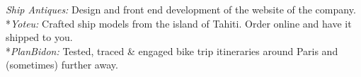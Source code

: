 \documentclass[11pt,a4paper,sans]{moderncv}
\begin{document}
{{\textit{Ship Antiques:} Design and front end development of the website of the company. \href{https://shipantiques.herokuapp.com/}   {} }
\\*{\textit{Yoteu:}  Crafted ship models from the island of Tahiti. Order online and have it shipped to you. \href{https://yoteu.herokuapp.com/}   {} }
\\*{\textit{PlanBidon:}  Tested, traced \& engaged bike trip itineraries around Paris and (sometimes) further away. \href{https://planbidon.herokuapp.com/}   {} }}
\end{document}
